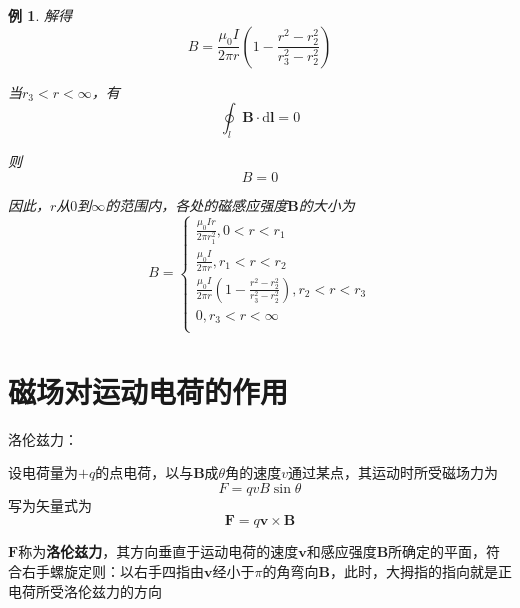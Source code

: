 \documentclass[12pt, a4paper, twoside]{ctexbook}
\newtheorem{example}[theorem]{例}
\begin{document}
\begin{example}
    解得
    $$
    B=\frac{\mu_0 I}{2\pi r}\left(1-\frac{r^2-r_2^2}{r_3^2-r_2^2}\right)
    $$

    当$r_3<r<\infty$，有
    $$
    \oint_l\boldsymbol{B}\cdot\mathrm{d}\boldsymbol{l}=0
    $$
    
    则
    $$
    B=0
    $$

    因此，$r$从$0$到$\infty$的范围内，各处的磁感应强度$\boldsymbol{B}$的大小为
    $$
    B=\left\{ \begin{array}{l}
        \frac{\mu _0Ir}{2\pi r_{1}^{2}},0<r<r_1\\
        \frac{\mu _0I}{2\pi r},r_1<r<r_2\\
        \frac{\mu _0I}{2\pi r}\left( 1-\frac{r^2-r_{2}^{2}}{r_{3}^{2}-r_{2}^{2}} \right) ,r_2<r<r_3\\
        0,r_3<r<\infty\\
    \end{array} \right. 
    $$
\end{example}
\section{磁场对运动电荷的作用}
{\sonti 洛伦兹力}：

设电荷量为$+q$的点电荷，以与$\boldsymbol{B}$成$\theta$角的速度$v$通过某点，其运动时所受磁场力为
$$
F=qvB\sin\theta
$$
写为矢量式为
$$
\boldsymbol{F}=q\boldsymbol{v}\times\boldsymbol{B}
$$

$\boldsymbol{F}$称为\textbf{洛伦兹力}，其方向垂直于运动电荷的速度$\boldsymbol{v}$和感应强度$\boldsymbol{B}$所确定的平面，符合右手螺旋定则：以右手四指由$\boldsymbol{v}$经小于$\pi$的角弯向$\boldsymbol{B}$，此时，大拇指的指向就是正电荷所受洛伦兹力的方向
\end{document}

